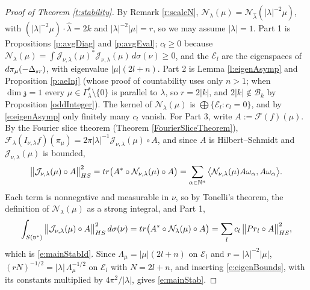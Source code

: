 \documentclass[11pt]{amsart}
\theoremstyle{plain}
\theoremstyle{definition}
\theoremstyle{remark}
\numberwithin{equation}{section}
\def\fz{\mathfrak{z}}
\def\fv{\mathfrak{v}}
\def\cB{\mathcal{B}}
\def\cE{\mathcal{E}}
\def\cN{\mathcal{N}}
\def\cJ{\mathcal{J}}
\def\cF{\mathcal{F}}
\def\mz{\setminus\{0\}}
\def\N{{\mathbb N}}%
\numberwithin{equation}{section}
\begin{document}
\begin{proof}[Proof of Theorem \ref{t:stability}]
	By Remark \ref{r:scaleN}, $\cN_\lambda(\mu)=\cN_{\hat\lambda}(|\lambda|^{-2}\mu)$, with $(|\lambda|^{-2}\mu)\cdot\hat\lambda=2k$ and $|\lambda|^{-2}|\mu|=r$, so we may assume $|\lambda|=1$. Part 1 is Propositions \ref{p:avgDiag} and \ref{p:avgEval}; $c_l\geq0$ because $\cN_\lambda(\mu)=\int\cJ_{\nu, \lambda}(\mu)^*\cJ_{\nu, \lambda}(\mu)\, d\sigma(\nu)\geq0$, and the $\cE_l$ are the eigenspaces of $d\pi_\mu(-\Delta_{\rm{sr}})$, with eigenvalue $|\mu|(2l+n)$. Part 2 is Lemma \ref{l:eigenAsymp} and Proposition \ref{p:aeInj} (whose proof of countability uses only $n>1$; when $\dim\fz=1$ every $\mu\in \Gamma_\lambda^*\mz$ is parallel to $\lambda$, so $r=2|k|$, and $2|k|\notin\cB_k$ by Proposition \ref{oddInteger}). The kernel of $\cN_\lambda(\mu)$ is $\bigoplus\{\cE_l: c_l=0\}$, and by \eqref{e:eigenAsymp} only finitely many $c_l$ vanish. For Part 3, write $A:=\cF(f)(\mu)$. By the Fourier slice theorem (Theorem \ref{FourierSliceTheorem}), $\cF_\lambda(I_{\nu, \lambda}f)(\pi_\mu)=2\pi|\lambda|^{-1}\cJ_{\nu, \lambda}(\mu)\circ A$, and since $A$ is Hilbert--Schmidt and $\cJ_{\nu, \lambda}(\mu)$ is bounded,
	\begin{align*}
		\big\|\cJ_{\nu, \lambda}(\mu)\circ A\big\|_{HS}^2={\rm tr}\big(A^*\circ\cN_{\nu, \lambda}(\mu)\circ A\big)=\sum_{\alpha\in \N^n}\big\langle\cN_{\nu, \lambda}(\mu)A\omega_\alpha, A\omega_\alpha\big\rangle.
	\end{align*}
	Each term is nonnegative and measurable in $\nu$, so by Tonelli's theorem, the definition of $\cN_\lambda(\mu)$ as a strong integral, and Part 1,
	\begin{align*}
		\int_{S(\fv^*)}\big\|\cJ_{\nu, \lambda}(\mu)\circ A\big\|_{HS}^2\,d\sigma(\nu)={\rm tr}\big(A^*\circ\cN_{\lambda}(\mu)\circ A\big)=\sum_l c_l\,\big\|{\rm Pr}_l\circ A\big\|_{HS}^2,
	\end{align*}
	which is \eqref{e:mainStabId}. Since $\Lambda_\mu=|\mu|(2l+n)$ on $\cE_l$ and $r=|\lambda|^{-2}|\mu|$, $(rN)^{-1/2}=|\lambda|\,\Lambda_\mu^{-1/2}$ on $\cE_l$ with $N=2l+n$, and inserting \eqref{e:eigenBounds}, with its constants multiplied by $4\pi^2/|\lambda|$, gives \eqref{e:mainStab}.
\end{proof}
\end{document}
